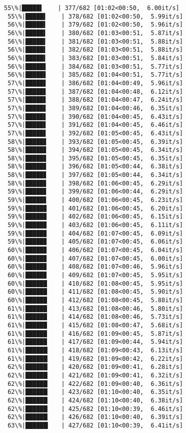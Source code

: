 \documentclass[11pt]{article}
\begin{document}
\begin{Verbatim}[commandchars=\\\{\}]
 55\%|█████▌    | 377/682 [01:02<00:50,  6.00it/s]
 55\%|█████▌    | 378/682 [01:02<00:50,  5.99it/s]
 56\%|█████▌    | 379/682 [01:02<00:50,  5.96it/s]
 56\%|█████▌    | 380/682 [01:03<00:51,  5.87it/s]
 56\%|█████▌    | 381/682 [01:03<00:51,  5.88it/s]
 56\%|█████▌    | 382/682 [01:03<00:51,  5.88it/s]
 56\%|█████▌    | 383/682 [01:03<00:51,  5.84it/s]
 56\%|█████▋    | 384/682 [01:03<00:51,  5.77it/s]
 56\%|█████▋    | 385/682 [01:04<00:51,  5.77it/s]
 57\%|█████▋    | 386/682 [01:04<00:49,  5.96it/s]
 57\%|█████▋    | 387/682 [01:04<00:48,  6.12it/s]
 57\%|█████▋    | 388/682 [01:04<00:47,  6.24it/s]
 57\%|█████▋    | 389/682 [01:04<00:46,  6.35it/s]
 57\%|█████▋    | 390/682 [01:04<00:45,  6.43it/s]
 57\%|█████▋    | 391/682 [01:04<00:45,  6.46it/s]
 57\%|█████▋    | 392/682 [01:05<00:45,  6.43it/s]
 58\%|█████▊    | 393/682 [01:05<00:45,  6.39it/s]
 58\%|█████▊    | 394/682 [01:05<00:45,  6.34it/s]
 58\%|█████▊    | 395/682 [01:05<00:45,  6.35it/s]
 58\%|█████▊    | 396/682 [01:05<00:44,  6.38it/s]
 58\%|█████▊    | 397/682 [01:05<00:44,  6.34it/s]
 58\%|█████▊    | 398/682 [01:06<00:45,  6.29it/s]
 59\%|█████▊    | 399/682 [01:06<00:44,  6.29it/s]
 59\%|█████▊    | 400/682 [01:06<00:45,  6.23it/s]
 59\%|█████▉    | 401/682 [01:06<00:45,  6.20it/s]
 59\%|█████▉    | 402/682 [01:06<00:45,  6.15it/s]
 59\%|█████▉    | 403/682 [01:06<00:45,  6.11it/s]
 59\%|█████▉    | 404/682 [01:07<00:45,  6.09it/s]
 59\%|█████▉    | 405/682 [01:07<00:45,  6.06it/s]
 60\%|█████▉    | 406/682 [01:07<00:45,  6.04it/s]
 60\%|█████▉    | 407/682 [01:07<00:45,  6.00it/s]
 60\%|█████▉    | 408/682 [01:07<00:46,  5.96it/s]
 60\%|█████▉    | 409/682 [01:07<00:45,  5.95it/s]
 60\%|██████    | 410/682 [01:08<00:45,  5.95it/s]
 60\%|██████    | 411/682 [01:08<00:45,  5.90it/s]
 60\%|██████    | 412/682 [01:08<00:45,  5.88it/s]
 61\%|██████    | 413/682 [01:08<00:46,  5.80it/s]
 61\%|██████    | 414/682 [01:08<00:46,  5.73it/s]
 61\%|██████    | 415/682 [01:08<00:47,  5.68it/s]
 61\%|██████    | 416/682 [01:09<00:45,  5.87it/s]
 61\%|██████    | 417/682 [01:09<00:44,  5.94it/s]
 61\%|██████▏   | 418/682 [01:09<00:43,  6.13it/s]
 61\%|██████▏   | 419/682 [01:09<00:42,  6.22it/s]
 62\%|██████▏   | 420/682 [01:09<00:41,  6.28it/s]
 62\%|██████▏   | 421/682 [01:09<00:41,  6.32it/s]
 62\%|██████▏   | 422/682 [01:09<00:40,  6.36it/s]
 62\%|██████▏   | 423/682 [01:10<00:40,  6.35it/s]
 62\%|██████▏   | 424/682 [01:10<00:40,  6.38it/s]
 62\%|██████▏   | 425/682 [01:10<00:39,  6.46it/s]
 62\%|██████▏   | 426/682 [01:10<00:40,  6.39it/s]
 63\%|██████▎   | 427/682 [01:10<00:39,  6.41it/s]

\end{Verbatim}
\end{document}
